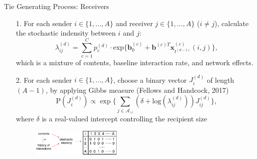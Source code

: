 \documentclass[10pt, xcolor=table]{beamer}
\theoremstyle{definition}
\theoremstyle{remark}
\begin{document}
\begin{frame}{Tie Generating Process: Receivers}
		\begin{itemize}
		\item [1.] For each sender $i \in \{1,...,A\}$ and receiver $j \in \{1,...,A\}$ ($i \neq j$), calculate the stochastic indensity between $i$ and $j$:
			\begin{equation*}\lambda^{(d)}_{ij}=\sum\limits_{c=1}^{C} p^{(d)}_c
		\cdot  \mbox{exp}\Big\{\boldsymbol{b}^{(c)}_0 + \boldsymbol{b}^{(c)T}\boldsymbol{x}^{(c)}_{t^{(d-1)}}(i, j)\Big\},	\end{equation*}\normalsize
		which is a mixture of contents, baseline interaction rate, and network effects.\\ \vspace{0.4cm}
		\item[2.] For each sender $i \in \{1,...,A\}$, choose a binary vector $J^{(d)}_i$ of length $(A-1)$, by applying Gibbs measure (Fellows and Handcock, 2017) 
		\begin{equation*} \text{P}(J_i^{(d)}) \propto \exp\Big\{ \sum_{j \in \mathcal{A}_{\backslash i}} (\delta+\mbox{log}(\lambda_{ij}^{(d)}))J_{ij}^{(d)} \Big\},
		\end{equation*}
		\normalsize
		where $\delta$ is a real-valued intercept controlling the recipient size\\ \vspace{0.1cm}
 \begin{figure}
 	\includegraphics[width=0.4\textwidth]{figures/edge.pdf}
 \end{figure}	
	\end{itemize}
	\end{frame}
\end{document}

